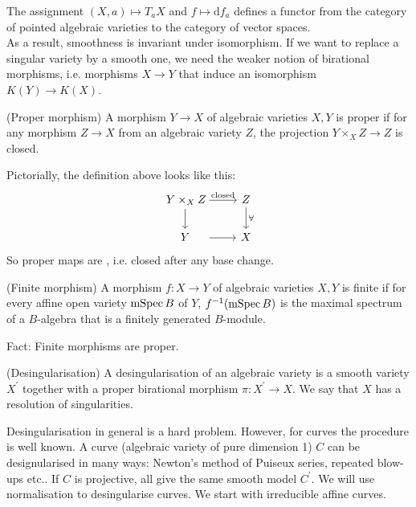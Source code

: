 \documentclass[a4paper,11pt]{article}
\begin{document}
			\noindent The assignment $(X,a)\mapsto T_aX$ and $f\mapsto \mathrm{d}f_a$ defines a functor from the category of pointed algebraic varieties to the category of vector spaces.
			\\

			\noindent As a result, smoothness is invariant under isomorphism. If we want to replace a singular variety by a smooth one, we need the weaker notion of birational morphisms, i.e. morphisms $X\rightarrow Y$ that induce an isomorphism $K(Y)\rightarrow K(X)$.

			\begin{defi}
				(Proper morphism) A morphism $Y\rightarrow X$ of algebraic varieties $X,Y$ is proper if for any morphism $Z\rightarrow X$ from an algebraic variety $Z$, the projection $Y\times_X Z\rightarrow Z$ is closed.
			\end{defi}

			\noindent Pictorially, the definition above looks like this:
			\begin{equation*}
				\begin{tikzcd}[/tikz/column 1/.append style={nodes={text width=width("$YxXlZ$"), text centered}}]
					Y\times_XZ\ar[r,"\text{closed}"]\ar[d] & Z\ar[d,"\forall"]\\
					Y\ar[r] & X
				\end{tikzcd}
			\end{equation*}
			So proper maps are , i.e. closed after any base change.
			
			\begin{defi}
				(Finite morphism) A morphism $f:X\rightarrow Y$ of algebraic varieties $X,Y$ is finite if for every affine open variety $\operatorname{mSpec} B$ of $Y$, $f^{-1}(\operatorname{mSpec} B)$ is the maximal spectrum of a $B$-algebra that is a finitely generated $B$-module.  
			\end{defi}

			\noindent Fact: Finite morphisms are proper.

			\begin{defi}
				(Desingularisation) A desingularisation of an algebraic variety is a smooth variety $X^{\prime}$ together with a proper birational morphism $\pi:X^\prime\rightarrow X$. We say that $X$ has a resolution of singularities.
			\end{defi}

			Desingularisation in general is a hard problem. However, for curves the procedure is well known. A curve (algebraic variety of pure dimension 1) $C$ can be designularised in many ways: Newton's method of Puiseux series, repeated blow-ups etc.. If $C$ is projective, all give the same smooth model $C^\prime$. We will use normalisation to desingularise curves. We start with irreducible affine curves.
\end{document}
